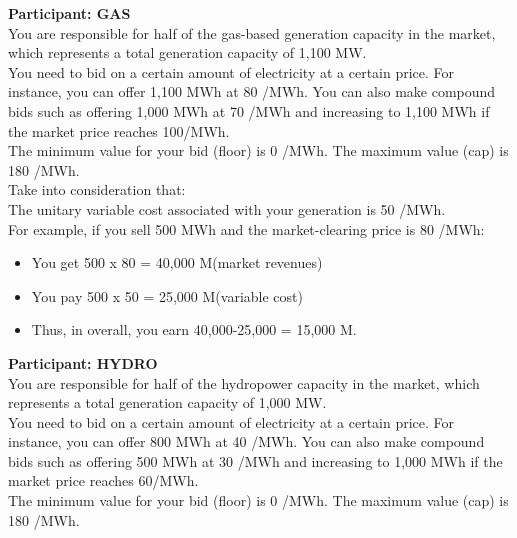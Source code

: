 \documentclass[3p]{elsarticle} %
\begin{document}
\newpage


\textbf{Participant: GAS} \\

You are responsible for half of the gas-based generation capacity in the market, which represents a total generation capacity of 1,100 MW. \\

You need to bid on a certain amount of electricity at a certain price. For instance, you can offer 1,100 MWh at 80 \EUR/MWh. You can also make compound bids such as offering 1,000 MWh at 70 \EUR/MWh and increasing to 1,100 MWh if the market price reaches 100\EUR/MWh.\\

The minimum value for your bid (floor) is 0 \EUR/MWh. The maximum value (cap) is 180 \EUR/MWh. \\

Take into consideration that: \\

The unitary variable cost associated with your generation is 50 \EUR/MWh.\\

For example, if you sell 500 MWh and the market-clearing price is 80 \EUR/MWh:

\begin{itemize}
\item You get 500 x 80 = 40,000 M\EUR (market revenues)
\item You pay 500 x 50 = 25,000 M\EUR (variable cost)
\item Thus, in overall, you earn 40,000-25,000 = 15,000 M\EUR.
\end{itemize}

\newpage

\textbf{Participant: HYDRO} \\

You are responsible for half of the hydropower capacity in the market, which represents a total generation capacity of 1,000 MW. \\

You need to bid on a certain amount of electricity at a certain price. For instance, you can offer 800 MWh at 40 \EUR/MWh. You can also make compound bids such as offering 500 MWh at 30 \EUR/MWh and increasing to 1,000 MWh if the market price reaches 60\EUR/MWh. \\

The minimum value for your bid (floor) is 0 \EUR/MWh. The maximum value (cap) is 180 \EUR/MWh. \\
\end{document}
